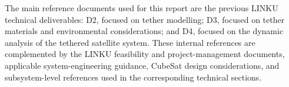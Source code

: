 The main reference documents used for this report are the previous LINKU technical deliverables: D2, focused on tether modelling; D3, focused on tether materials and environmental considerations; and D4, focused on the dynamic analysis of the tethered satellite system. These internal references are complemented by the LINKU feasibility and project-management documents, applicable system-engineering guidance, CubeSat design considerations, and subsystem-level references used in the corresponding technical sections.

